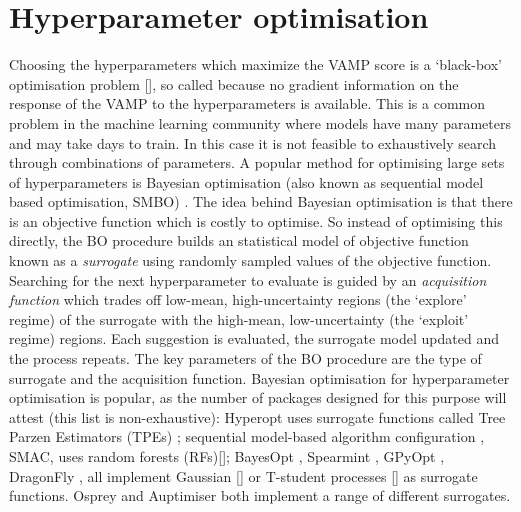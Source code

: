 \section{Hyperparameter optimisation}
Choosing the hyperparameters which maximize the VAMP score is a `black-box' optimisation problem [], so called because no gradient information on the response of the VAMP to the hyperparameters is available. This is a common problem in the machine learning community where models have many parameters and may take days to train. In this case it is not feasible to exhaustively search through combinations of parameters. A popular method for optimising large sets of hyperparameters is Bayesian optimisation (also known as sequential model based optimisation, SMBO)  \cite{hutterSequentialModelbasedOptimization2011} \cite{NIPS2012_4522}\cite{bergstraAlgorithmsHyperParameterOptimizationa} \cite{bergstraMakingScienceModel2013}. The idea behind Bayesian optimisation is  \cite{brochuTutorialBayesianOptimization2010} that there is an objective function which is costly to optimise. So instead of optimising this directly, the BO procedure builds an statistical model of  objective function known as a \emph{surrogate} using randomly sampled  values of the objective function. Searching for the next hyperparameter to evaluate is guided by an \emph{acquisition function} which trades off low-mean, high-uncertainty regions (the `explore' regime)  of the surrogate with the high-mean, low-uncertainty (the `exploit' regime) regions. Each suggestion is evaluated, the surrogate model updated and the process repeats. The key parameters of the BO procedure are the type of surrogate and the acquisition function. Bayesian optimisation for hyperparameter optimisation is popular, as the number of packages designed for this purpose will attest (this list is non-exhaustive): Hyperopt \cite{bergstraHyperoptPythonLibrary2013} uses surrogate functions called Tree Parzen Estimators (TPEs) \cite{bergstraAlgorithmsHyperParameterOptimization}; sequential model-based algorithm configuration  \cite{hutterSequentialModelbasedOptimization2011}, SMAC, uses random forests (RFs)[]; BayesOpt \cite{martinez-cantinBayesOptBayesianOptimization2014}, Spearmint \cite{DBLP:conf/uai/GelbartSA14}\cite{snoekAbstractBayesianOptimization2013}\cite{snoekInputWarpingBayesian2014a}\cite{NIPS2013_5086}\cite{NIPS2012_4522}, GPyOpt \cite{gpyopt2016}, DragonFly \cite{JMLR:v21:18-223}, all implement Gaussian [] or T-student processes [] as surrogate functions. Osprey \cite{mcgibbonOspreyHyperparameterOptimization2016a} and Auptimiser \cite{liuAuptimizerExtensibleOpenSource2019} both implement a range of different surrogates. 

